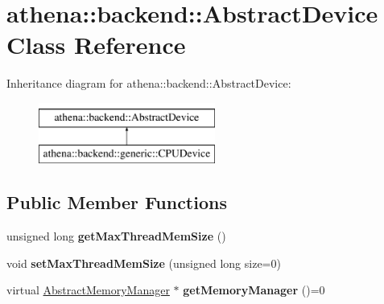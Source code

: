 \hypertarget{classathena_1_1backend_1_1_abstract_device}{}\section{athena\+:\+:backend\+:\+:Abstract\+Device Class Reference}
\label{classathena_1_1backend_1_1_abstract_device}
Inheritance diagram for athena\+:\+:backend\+:\+:Abstract\+Device\+:\begin{figure}[H]
\begin{center}
\leavevmode
\includegraphics[height=2.000000cm]{dc/dc2/classathena_1_1backend_1_1_abstract_device}
\end{center}
\end{figure}
\subsection*{Public Member Functions}
\begin{DoxyCompactItemize}
\item 
\mbox{\label{classathena_1_1backend_1_1_abstract_device_a636bacaa5fc15731e3d5450c2fa56524}} 
unsigned long {\bfseries get\+Max\+Thread\+Mem\+Size} ()
\item 
\mbox{\label{classathena_1_1backend_1_1_abstract_device_a890a1711ae7203de704a2b223adddccc}} 
void {\bfseries set\+Max\+Thread\+Mem\+Size} (unsigned long size=0)
\item 
\mbox{\label{classathena_1_1backend_1_1_abstract_device_aa3c928fe7cfa24e484131dcfffd3c106}} 
virtual \mbox{\hyperlink{classathena_1_1backend_1_1_abstract_memory_manager}{Abstract\+Memory\+Manager}} $\ast$ {\bfseries get\+Memory\+Manager} ()=0
\end{DoxyCompactItemize}

